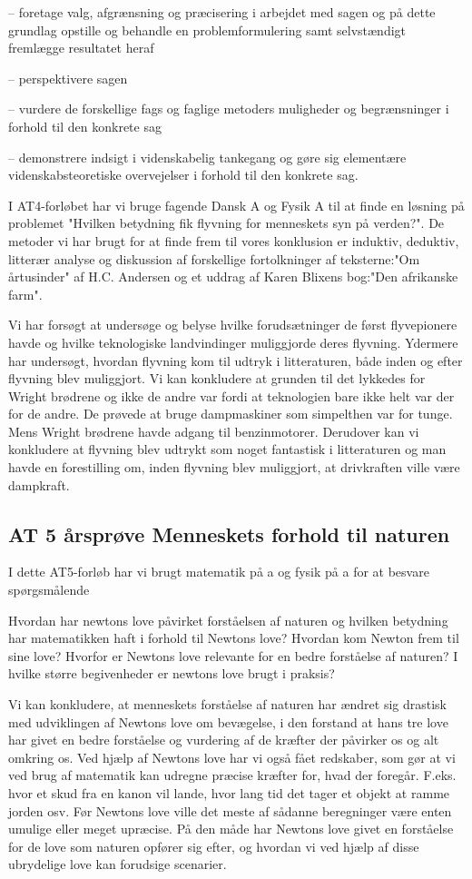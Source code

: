 \documentclass{article}
\begin{document}
– foretage valg, afgrænsning og præcisering i arbejdet med sagen og på dette grundlag opstille og behandle en problemformulering samt selvstændigt fremlægge resultatet heraf

– perspektivere sagen

– vurdere de forskellige fags og faglige metoders muligheder og begrænsninger i forhold til den konkrete sag

– demonstrere indsigt i videnskabelig tankegang og gøre sig elementære videnskabsteoretiske overvejelser i forhold til den konkrete sag.

I AT4-forløbet har vi bruge fagende Dansk A og Fysik A til at finde en løsning på problemet "Hvilken betydning fik flyvning for menneskets syn på verden?". De metoder vi har brugt for at finde frem til vores konklusion er induktiv, deduktiv, litterær analyse og diskussion af forskellige fortolkninger af teksterne:"Om årtusinder" af H.C. Andersen og et uddrag af Karen Blixens bog:"Den afrikanske farm".

Vi har forsøgt at undersøge og belyse hvilke forudsætninger de først flyvepionere havde og hvilke teknologiske landvindinger muliggjorde deres flyvning. Ydermere har undersøgt, hvordan flyvning kom til udtryk i litteraturen, både inden og efter flyvning blev muliggjort. Vi kan konkludere at grunden til det lykkedes for Wright brødrene og ikke de andre var fordi at teknologien bare ikke helt var der for de andre. De prøvede at bruge dampmaskiner som simpelthen var for tunge. Mens Wright brødrene havde adgang til benzinmotorer. Derudover kan vi konkludere at flyvning blev udtrykt som noget fantastisk i litteraturen og man havde en forestilling om, inden flyvning blev muliggjort, at drivkraften ville være dampkraft.

\subsection{AT 5 årsprøve Menneskets forhold til naturen}

I dette AT5-forløb har vi brugt matematik på a og fysik på a for at besvare spørgsmålende

Hvordan har newtons love påvirket forståelsen af naturen og hvilken betydning har matematikken haft i forhold til Newtons love? 
Hvordan kom Newton frem til sine love? 
Hvorfor er Newtons love relevante for en bedre forståelse af naturen?
I hvilke større begivenheder er newtons love brugt i praksis?

Vi kan konkludere, at menneskets forståelse af naturen har ændret sig drastisk med udviklingen af Newtons love om bevægelse, i den forstand at hans tre love har givet en bedre forståelse og vurdering af de kræfter der påvirker os og alt omkring os. Ved hjælp af Newtons love har vi også fået redskaber, som gør at vi ved brug af matematik kan udregne præcise kræfter for, hvad der foregår. F.eks. hvor et skud fra en kanon vil lande, hvor lang tid det tager et objekt at ramme jorden osv. Før Newtons love ville det meste af sådanne beregninger være enten umulige eller meget upræcise. På den måde har Newtons love givet en forståelse for de love som naturen opfører sig efter, og hvordan vi ved hjælp af disse ubrydelige love kan forudsige scenarier. 
\end{document}
